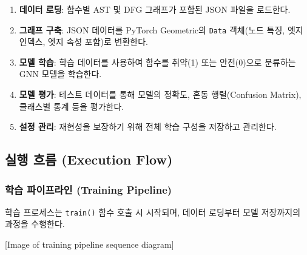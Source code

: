 \begin{enumerate}
    \item \textbf{데이터 로딩}: 함수별 AST 및 DFG 그래프가 포함된 JSON 파일을 로드한다.
    \item \textbf{그래프 구축}: JSON 데이터를 PyTorch Geometric의 \texttt{Data} 객체(노드 특징, 엣지 인덱스, 엣지 속성 포함)로 변환한다.
    \item \textbf{모델 학습}: 학습 데이터를 사용하여 함수를 취약(1) 또는 안전(0)으로 분류하는 GNN 모델을 학습한다.
    \item \textbf{모델 평가}: 테스트 데이터를 통해 모델의 정확도, 혼동 행렬(Confusion Matrix), 클래스별 통계 등을 평가한다.
    \item \textbf{설정 관리}: 재현성을 보장하기 위해 전체 학습 구성을 저장하고 관리한다.
\end{enumerate}


\subsection{실행 흐름 (Execution Flow)}

\subsubsection{학습 파이프라인 (Training Pipeline)}
학습 프로세스는 \texttt{train()} 함수 호출 시 시작되며, 데이터 로딩부터 모델 저장까지의 과정을 수행한다.



[Image of training pipeline sequence diagram]


